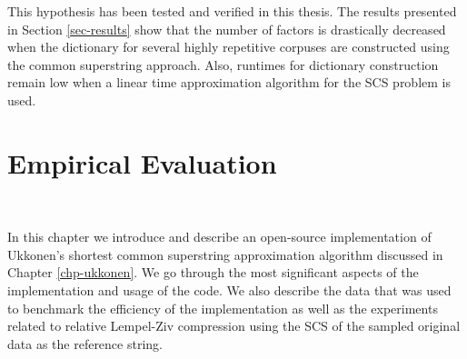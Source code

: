 \documentclass[english,twoside,censored,csm,algorithms-track-2020]{HYthesisML}
\theoremstyle{plain}
\theoremstyle{definition}
\numberwithin{testexample}{chapter}
\begin{document}
This hypothesis has been tested and verified in this thesis. The results presented in Section
\ref{sec-results} show that the number of factors is drastically decreased when the dictionary
for several highly repetitive corpuses are constructed using the common superstring approach.
Also, runtimes for dictionary construction remain low when a linear time approximation
algorithm for the SCS problem is used.
















\chapter{Empirical Evaluation}~\label{chp-results}

In this chapter we introduce and describe an open-source implementation of Ukkonen's shortest
common superstring
approximation algorithm discussed in Chapter \ref{chp-ukkonen}. We go through the most significant
aspects of the implementation and usage of the code. We also describe the data that was used to
benchmark the efficiency of the implementation as well as the experiments related to
relative Lempel-Ziv compression using the SCS of the sampled original data as the reference string.
\end{document}
